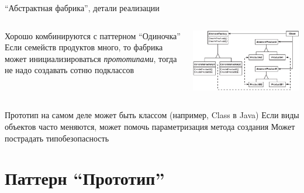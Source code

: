 \documentclass{../../slides-style}
\begin{document}
    \begin{frame}{\enquote{Абстрактная фабрика}, детали реализации}
        \begin{columns}
            \begin{column}{0.5\textwidth}
                \begin{outline}
                    \1 Хорошо комбинируются с паттерном \enquote{Одиночка}
                    \1 Если семейств продуктов много, то фабрика может инициализироваться \textit{прототипами}, тогда не надо создавать сотню подклассов
                \end{outline}
            \end{column}
            \begin{column}{0.5\textwidth}
                \begin{center}
                    \includegraphics[width=\textwidth]{abstractFactory.png}
                \end{center}
            \end{column}
        \end{columns}
        \begin{outline}
            \1 Прототип на самом деле может быть классом (например, Class в Java)
            \1 Если виды объектов часто меняются, может помочь параметризация метода создания
                \2 Может пострадать типобезопасность
        \end{outline}
    \end{frame}

    \section{Паттерн \enquote{Прототип}}
\end{document}
